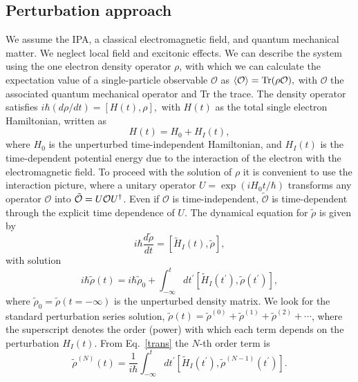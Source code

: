 \documentclass[floatfix,prb,aps,superscriptaddress,showpacs,11pt,preprint,letterpaper]{revtex4}
\begin{document}
\subsection{Perturbation approach}\label{pa}

We assume the IPA, a classical electromagnetic field, and quantum mechanical 
matter. We neglect local field and excitonic effects. We can describe the 
system using 
the one electron density operator ${\rho}$, with which we can calculate the 
expectation value of a single-particle observable $\mathcal{O}$ as 
$\langle{\cal O}\rangle = \mbox{Tr}({\rho}{\cal O}),\label{calo}$
with $\mathcal{O}$ the associated quantum mechanical operator and Tr the 
trace. The density operator satisfies
$i\hbar(d{\rho}/dt) = [H(t), {\rho}], \label{rho}$
with $H(t)$ as the total single electron Hamiltonian, written as 
\begin{equation*}
H(t) = H_{0} + H_{I}(t),  
\label{ache}
\end{equation*}
where $H_{0}$ is the unperturbed time-independent Hamiltonian, and $H_{I}(t)$
is the time-dependent potential energy due to the interaction of the electron 
with the electromagnetic field.
To proceed with the solution of $\rho$ it is convenient to use the interaction 
picture, where a unitary operator $U = \exp({iH_{0}t/\hbar})$ transforms any 
operator $\mathcal{O}$ into $\tilde{\mathcal{O}} = U{\cal O}U^{\dagger}$. 
Even if $\mathcal{O}$ is time-independent, $\tilde{\mathcal{O}}$ is 
time-dependent through the explicit time dependence of $U$. The dynamical 
equation for $\tilde{\rho}$ is given by
\begin{equation*}
i\hbar \frac{d\tilde{\rho}}{dt} = [\tilde{H}_{I}(t), \tilde{\rho}],
\label{rho1}
\end{equation*}
with solution 
\begin{equation}
i\hbar \tilde{\rho}(t) = 
    i\hbar \tilde{\rho}_{0} + 
    \int_{-\infty}^{t}dt^{\prime}
    [\tilde{H}_{I}(t^{\prime}),\tilde{\rho}(t^{\prime})],  
\label{trans}
\end{equation}
where $\tilde{\rho}_{0} = \tilde{\rho}(t = -\infty)$ is the unperturbed 
density matrix. We look for the standard perturbation series solution, 
$\tilde{\rho}(t) = \tilde{\rho}^{(0)} + \tilde{\rho}^{(1)} + 
\tilde{\rho}^{(2)} + \cdots$, where the superscript denotes the order (power) 
with which each term depends on the perturbation $H_{I}(t)$. From 
Eq.~\eqref{trans} the $N$-th order term is 
\begin{equation}
\tilde{\rho}^{(N)}(t) = 
    \frac{1}{i\hbar}\int_{-\infty }^{t}dt^{\prime}
    [\tilde{H}_{I}(t^{\prime }), \tilde{\rho}^{(N - 1)}(t^{\prime})].
\label{rhop}
\end{equation}
\end{document}
